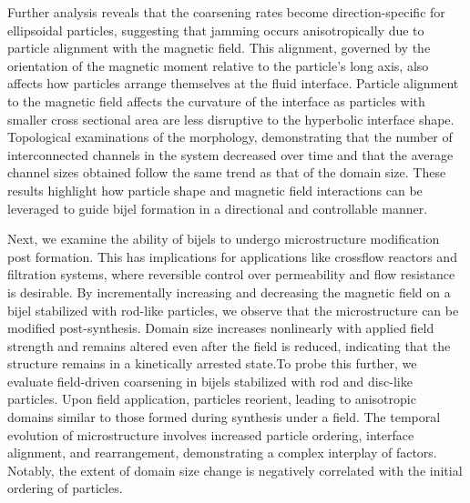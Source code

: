 \begin{front}
    Further analysis reveals that the coarsening rates become direction-specific for ellipsoidal particles, 
    suggesting that jamming occurs anisotropically due to particle alignment with the magnetic field. This alignment, governed by the 
    orientation of the magnetic moment relative to the particle's long axis, also affects how particles arrange themselves at the fluid 
    interface. Particle alignment to the magnetic field affects the curvature of the interface as particles with smaller cross sectional area 
    are less disruptive to the hyperbolic interface shape. Topological examinations of the morphology, 
    demonstrating that the number of interconnected channels in the system decreased over time and that the average channel sizes obtained follow
    the same trend as that of the domain size. These results highlight how particle shape and magnetic field interactions can be leveraged to 
    guide bijel formation in a directional and controllable manner.
    
    Next, we examine the ability of bijels to undergo microstructure modification post formation.
    This has implications for applications like crossflow reactors and filtration systems, where reversible control over 
    permeability and flow resistance is desirable. By incrementally increasing and decreasing the magnetic field on a bijel stabilized with 
    rod-like particles, we observe that the microstructure can be modified post-synthesis. Domain size increases nonlinearly with 
    applied field strength and remains altered even after the field is reduced, indicating that the structure remains in a kinetically arrested
    state.To probe this further, we evaluate field-driven coarsening in bijels stabilized with rod and disc-like particles. Upon field application, 
    particles reorient, leading to anisotropic domains similar to those formed during synthesis under a field. The temporal evolution of 
    microstructure involves increased particle ordering, interface alignment, and rearrangement, demonstrating a complex interplay of factors. 
    Notably, the extent of domain size change is negatively correlated with the initial ordering of particles.
    

\end{front}
